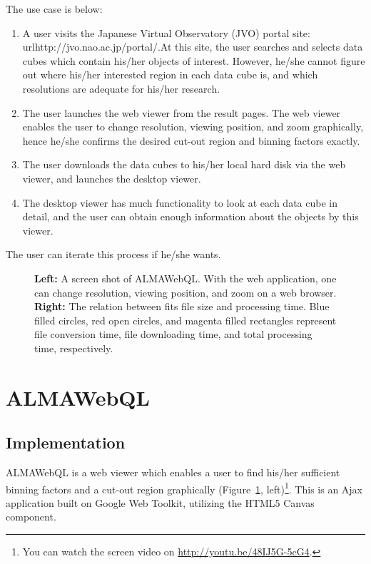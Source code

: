 The use case is below:
\begin{enumerate}
	\item A user visits the Japanese Virtual Observatory (JVO) portal site: url{http://jvo.nao.ac.jp/portal/}.At this site, the user searches and selects data cubes which contain his/her objects of interest. However, he/she cannot figure out where his/her interested region in each data cube is, and which resolutions are adequate for his/her research.
	
	\item The user launches the web viewer from the result pages. The web viewer enables the user to change resolution, viewing position, and zoom graphically, hence he/she confirms the desired cut-out region and binning factors exactly.
	
	\item The user downloads the data cubes to his/her local hard disk via the web viewer, and launches the desktop viewer.
	
	\item The desktop viewer has much functionality to look at each data cube in detail, and the user can obtain enough information about the objects by this viewer.
\end{enumerate}
The user can iterate this process if he/she wants.


\begin{figure}
	\caption{{\bf Left:} A screen shot of ALMAWebQL. With the web application, one can change resolution, viewing position, and zoom on a web browser. {\bf Right:} The relation between fits file size and processing time. Blue filled circles, red open circles, and magenta filled rectangles represent file conversion time, file downloading time, and total processing time, respectively.\label{O10_f2}}
\end{figure}


\section{ALMAWebQL}


\subsection{Implementation}

ALMAWebQL is a web viewer which enables a user to find his/her sufficient binning factors and a cut-out region graphically (Figure~\ref{O10_f2}, left)\footnote{You can watch the screen video on \url{http://youtu.be/48IJ5G-5cG4}.}. This is an Ajax application built on Google Web Toolkit, utilizing the HTML5 Canvas component.

